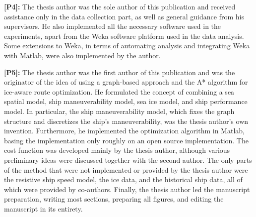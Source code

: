 \textbf{[P4]:} The thesis author was the sole author of this publication and received assistance only in the data collection part, as well as general guidance from his supervisors. He also implemented all the necessary software used in the experiments, apart from the Weka software platform used in the data analysis. Some extensions to Weka, in terms of automating analysis and integrating Weka with Matlab, were also implemented by the author.

\textbf{[P5]:} The thesis author was the first author of this publication and was the originator of the idea of using a graph-based approach and the A* algorithm for ice-aware route optimization. He formulated the concept of combining a sea spatial model, ship maneuverability model, sea ice model, and ship performance model. In particular, the ship maneuverability model, which fixes the graph structure and discretizes the ship's maneuverability, was the thesis author's own invention. Furthermore, he implemented the optimization algorithm in Matlab, basing the implementation only roughly on an open source implementation.  The cost function was developed mainly by the thesis author, although various preliminary ideas were discussed together with the second author. The only parts of the method that were not implemented or provided by the thesis author were the resistive ship speed model, the ice data, and the historical ship data, all of which were provided by co-authors. Finally, the thesis author led the manuscript preparation, writing most sections, preparing all figures, and editing the manuscript in its entirety.